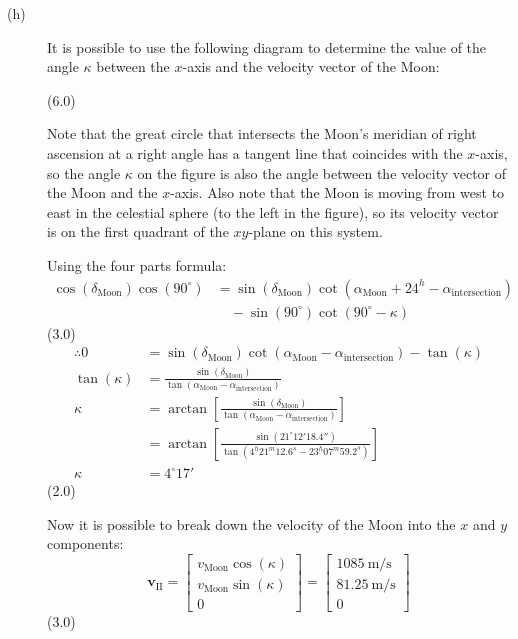 \begin{description}
\item[(h)] It is possible to use the following diagram to determine the value
  of the angle $\kappa$ between the $x$-axis and the velocity vector of the
  Moon:

  \hfill(6.0)

  Note that the great circle that intersects the Moon's meridian of right
  ascension at a right angle has a tangent line that coincides with the
  $x$-axis, so the angle $\kappa$ on the figure is also the angle between the
  velocity vector of the Moon and the $x$-axis. Also note that the Moon is
  moving from west to east in the celestial sphere (to the left in the
  figure), so its velocity vector is on the first quadrant of the $xy$-plane
  on this system.

  Using the four parts formula:
  \begin{align*}
    \cos(\delta_{\mathrm{Moon}})\cos(90^\circ)
      &= \sin(\delta_{\mathrm{Moon}})
         \cot(\alpha_{\mathrm{Moon}} + 24^h - \alpha_{\mathrm{intersection}})\\
      &\quad - \sin(90^\circ)\cot(90^\circ - \kappa)
  \end{align*}
  \hfill(3.0)
  \begin{align*}
    \therefore 0 &= \sin(\delta_{\mathrm{Moon}})
        \cot(\alpha_{\mathrm{Moon}} - \alpha_{\mathrm{intersection}})
        - \tan(\kappa)\\
    \tan(\kappa) &= \frac{\sin(\delta_{\mathrm{Moon}})}
        {\tan(\alpha_{\mathrm{Moon}} - \alpha_{\mathrm{intersection}})}\\
    \kappa &= \arctan\left[\frac{\sin(\delta_{\mathrm{Moon}})}
        {\tan(\alpha_{\mathrm{Moon}} - \alpha_{\mathrm{intersection}})}\right]\\
      &= \arctan\left[\frac{\sin(21^\circ 12' 18.4'')}
        {\tan(4^h 21^m 12.6^s - 23^h 07^m 59.2^s)}\right]\\
    \kappa &= 4^\circ 17'
  \end{align*}
  \hfill(2.0)

  Now it is possible to break down the velocity of the Moon into the $x$ and
  $y$ components:
  \[
    \mathbf{v}_{\mathrm{II}} =
    \begin{bmatrix}
      v_{\mathrm{Moon}}\cos(\kappa)\\
      v_{\mathrm{Moon}}\sin(\kappa)\\
      0
    \end{bmatrix}
    =
    \begin{bmatrix}
      1085\ \mathrm{m/s}\\
      81.25\ \mathrm{m/s}\\
      0
    \end{bmatrix}
  \]
  \hfill(3.0)


\end{description}

